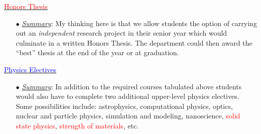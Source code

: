\documentclass[12pt,preprint]{aastex}
\newcommand{\red}[1]{\textcolor{red}{#1}}
\newcommand{\blue}[1]{\textcolor{blue}{#1}}
\begin{document}
\begin{itemize*}
\item{\underline{\red{Honors Thesis}}
  \begin{itemize}
    \item[$\bullet$]{\underline{\em Summary}: My thinking here is that we allow
      students the option of carrying out an \emph{independent} research project
      in their senior year which would culminate in a written Honors Thesis.
      The department could then award the ``best'' thesis at the end of the year
      or at graduation.}
  \end{itemize}
}

\item{\underline{\blue{Physics Electives}}
  \begin{itemize}
    \item[$\bullet$]{\underline{\em Summary}: In addition to the required
      courses tabulated above students would also have to complete two
      additional upper-level physics electives.  Some possibilities include:
      astrophysics, computational physics, optics, nuclear and particle physics,
      simulation and modeling, nanoscience, \red{solid state physics},
      \red{strength of materials}, etc.}
  \end{itemize}
}
\end{itemize*}

\end{document}
